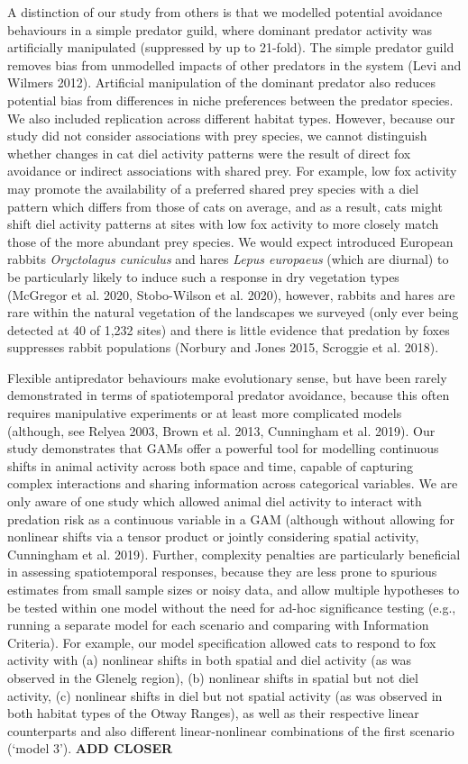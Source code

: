 \documentclass[preprint, 3p, authoryear]{elsarticle} %
\begin{document}
A distinction of our study from others is that we modelled potential avoidance behaviours in a simple predator guild, where dominant predator activity was artificially manipulated (suppressed by up to 21-fold). The simple predator guild removes bias from unmodelled impacts of other predators in the system (Levi and Wilmers 2012). Artificial manipulation of the dominant predator also reduces potential bias from differences in niche preferences between the predator species. We also included replication across different habitat types. However, because our study did not consider associations with prey species, we cannot distinguish whether changes in cat diel activity patterns were the result of direct fox avoidance or indirect associations with shared prey. For example, low fox activity may promote the availability of a preferred shared prey species with a diel pattern which differs from those of cats on average, and as a result, cats might shift diel activity patterns at sites with low fox activity to more closely match those of the more abundant prey species. We would expect introduced European rabbits \emph{Oryctolagus cuniculus} and hares \emph{Lepus europaeus} (which are diurnal) to be particularly likely to induce such a response in dry vegetation types (McGregor et al. 2020, Stobo-Wilson et al. 2020), however, rabbits and hares are rare within the natural vegetation of the landscapes we surveyed (only ever being detected at 40 of 1,232 sites) and there is little evidence that predation by foxes suppresses rabbit populations (Norbury and Jones 2015, Scroggie et al. 2018).

Flexible antipredator behaviours make evolutionary sense, but have been rarely demonstrated in terms of spatiotemporal predator avoidance, because this often requires manipulative experiments or at least more complicated models (although, see Relyea 2003, Brown et al. 2013, Cunningham et al. 2019). Our study demonstrates that GAMs offer a powerful tool for modelling continuous shifts in animal activity across both space and time, capable of capturing complex interactions and sharing information across categorical variables. We are only aware of one study which allowed animal diel activity to interact with predation risk as a continuous variable in a GAM (although without allowing for nonlinear shifts via a tensor product or jointly considering spatial activity, Cunningham et al. 2019). Further, complexity penalties are particularly beneficial in assessing spatiotemporal responses, because they are less prone to spurious estimates from small sample sizes or noisy data, and allow multiple hypotheses to be tested within one model without the need for ad-hoc significance testing (e.g., running a separate model for each scenario and comparing with Information Criteria). For example, our model specification allowed cats to respond to fox activity with (a) nonlinear shifts in both spatial and diel activity (as was observed in the Glenelg region), (b) nonlinear shifts in spatial but not diel activity, (c) nonlinear shifts in diel but not spatial activity (as was observed in both habitat types of the Otway Ranges), as well as their respective linear counterparts and also different linear-nonlinear combinations of the first scenario (`model 3'). \textbf{ADD CLOSER}
\end{document}
